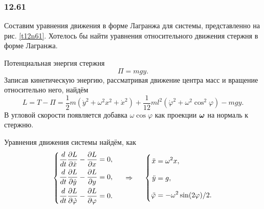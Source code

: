 \subsubsection*{12.61}

Составим уравнения движения в форме Лагранжа для системы, представленно на рис. \ref{t12n61}. Хотелось бы найти уравнения относительного движения стержня в форме Лагранжа.

Потенциальная энергия стержня
\begin{equation*}
    \Pi = mgy.
\end{equation*}
Записав кинетическую энергию, рассматривая движение центра масс и вращение относительно него, найдём 
\begin{equation}
    L = T - \Pi = 
    \frac{1}{2} m \left(
        \dot{y}^2 + \omega^2 x^2 + \dot{x}^2
    \right) + 
    \frac{1}{12} m l^2 \left(
        \dot{\varphi}^2 + \omega^2 \cos^2 \varphi
    \right) - mgy.
\end{equation}
В угловой скорости появляется добавка $\omega \cos \varphi$ как проекции $\mbox{\boldmath $\omega$}$ на нормаль к стержню. 

Уравнения движения системы найдём, как
\begin{equation}
    \left\{\begin{aligned}
        \EqL{x},  \\
        \EqL{y}, \\
        \EqL{\varphi}.
    \end{aligned}\right.
    \hspace{0.5cm} \Rightarrow \hspace{0.5cm} 
    \left\{\begin{aligned}
       \vp  \ddot{x} &= \omega^2 x,\\
       \vp  \ddot{y} &= g, \\
       \vp  \ddot{\varphi} &= -  \omega^2 \sin (2 \varphi) / 2.
    \end{aligned}\right.
\end{equation}